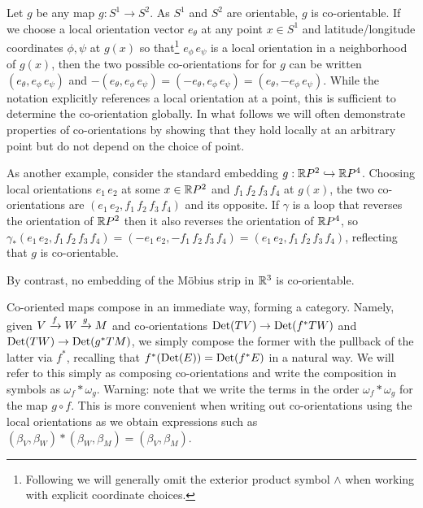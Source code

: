 \begin{example}
	Let $g$ be any map $g: S^1\to S^2$.
	As $S^1$ and $S^2$ are orientable, $g$ is co-orientable.
	If we choose a local orientation vector $e_{\theta}$ at any point $x\in S^1$ and latitude/longitude coordinates $\phi,\psi$ at $g(x)$ so that\footnote{Following \cite{BoTu82} we will generally omit the exterior product symbol $\wedge$ when working with explicit coordinate choices.} $e_\phi\, e_\psi$ is a local orientation in a neighborhood of $g(x)$, then the two possible co-orientations for for $g$ can be written $(e_\theta, e_\phi\, e_\psi)$ and $-(e_\theta, e_\phi\, e_\psi)=(-e_\theta, e_\phi \,e_\psi)=(e_\theta,- e_\phi\, e_\psi)$.
	While the notation explicitly references a local orientation at a point, this is sufficient to determine the co-orientation globally.
	In what follows we will often demonstrate properties of co-orientations by showing that they hold locally at an arbitrary point but do not depend on the choice of point.

	As another example, consider the standard embedding $g:\mathbb{R} P^2\hookrightarrow \mathbb{R} P^4$.
	Choosing local orientations $e_1\,e_2$ at some $x\in \mathbb{R} P^2$ and $f_1\,f_2\,f_3\,f_4$ at $g(x)$, the two co-orientations are
	$(e_1\,e_2, f_1\,f_2\,f_3\,f_4)$ and its opposite.
	If $\gamma$ is a loop that reverses the orientation of $\mathbb{R} P^2$ then it also reverses the orientation of $\mathbb{R} P^4$, so $\gamma_*(e_1\,e_2, f_1\,f_2\,f_3\,f_4)=(-e_1\,e_2,- f_1\,f_2\,f_3\,f_4)=(e_1\,e_2, f_1\,f_2\,f_3\,f_4)$, reflecting that $g$ is co-orientable.

	By contrast, no embedding of the M\"obius strip in $\mathbb{R}^3$ is co-orientable.
\end{example}

\begin{remark}\label{R: cooriented composition}
	Co-oriented maps compose in an immediate way, forming a category.
	Namely, given $V\xrightarrow{f} W\xrightarrow{g}M$ and co-orientations ${\rm Det}(TV)\to {\rm Det}(f^*TW)$ and ${\rm Det}(TW)\to {\rm Det}(g^*TM)$, we simply compose the former with the pullback of the latter via $f^*$, recalling that $f^*({\rm Det}(E))={\rm Det}(f^*E)$ in a natural way.
	We will refer to this simply as composing co-orientations and write the composition in symbols as $\omega_f*\omega_g$.
	Warning: note that we write the terms in the order $\omega_f*\omega_g$ for the map $g\circ f$.
	This is more convenient when writing out co-orientations using the local orientations as we obtain expressions such as $(\beta_V, \beta_W)*(\beta_W,\beta_M)=(\beta_V,\beta_M)$.
\end{remark}

